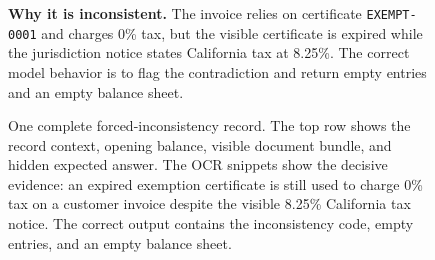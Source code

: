 \begin{figure}[t]
{\begin{minipage}{\dimexpr0.965\textwidth-2\fboxsep-2\fboxrule\relax}
\vspace{4pt}
\footnotesize
\textbf{Why it is inconsistent.} The invoice relies on certificate \texttt{EXEMPT-0001} and charges 0\% tax, but the visible certificate is expired while the jurisdiction notice states California tax at 8.25\%. The correct model behavior is to flag the contradiction and return empty entries and an empty balance sheet.
\end{minipage}}
\caption{One complete forced-inconsistency record. The top row shows the record context, opening balance, visible document bundle, and hidden expected answer. The OCR snippets show the decisive evidence: an expired exemption certificate is still used to charge 0\% tax on a customer invoice despite the visible 8.25\% California tax notice. The correct output contains the inconsistency code, empty entries, and an empty balance sheet.}
\label{fig:dataset-samples}
\end{figure}

